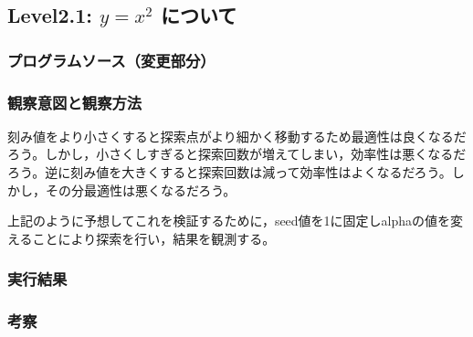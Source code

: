 \subsection{Level2.1: $y=x^2$ について}
\subsubsection{プログラムソース（変更部分）}

\subsubsection{観察意図と観察方法}
刻み値をより小さくすると探索点がより細かく移動するため最適性は良くなるだろう。しかし，小さくしすぎると探索回数が増えてしまい，効率性は悪くなるだろう。逆に刻み値を大きくすると探索回数は減って効率性はよくなるだろう。しかし，その分最適性は悪くなるだろう。

上記のように予想してこれを検証するために，seed値を1に固定しalphaの値を変えることにより探索を行い，結果を観測する。
\subsubsection{実行結果}
\subsubsection{考察}

